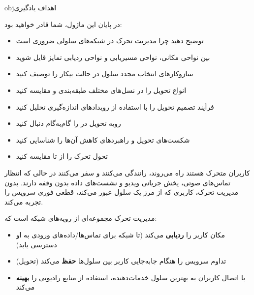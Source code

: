 \begin{CNbox}[unbreakable]{obj}{اهداف یادگیری}

در پایان این ماژول، شما قادر خواهید بود:

\begin{itemize}
\tightlist
\item
  توضیح دهید چرا مدیریت تحرک در شبکه‌های سلولی ضروری است
\item
  بین نواحی مکانی، نواحی مسیریابی و نواحی ردیابی تمایز قایل شوید
\item
  سازوکارهای انتخاب مجدد سلول در حالت بیکار را توصیف کنید
\item
  انواع تحویل را در نسل‌های مختلف طبقه‌بندی و مقایسه کنید
\item
  فرآیند تصمیم تحویل را با استفاده از رویدادهای اندازه‌گیری تحلیل کنید
\item
  رویه تحویل  در  را گام‌به‌گام دنبال کنید
\item
  شکست‌های تحویل و راهبردهای کاهش آن‌ها را شناسایی کنید
\item
  تحول تحرک را از  تا  مقایسه کنید
\end{itemize}

\end{CNbox}



\CNchained{}

کاربران متحرک هستند  راه می‌روند، رانندگی می‌کنند و سفر می‌کنند در حالی که انتظار تماس‌های صوتی، پخش جریانی ویدیو و نشست‌های داده بدون وقفه دارند. بدون مدیریت تحرک، کاربری که از مرز یک سلول عبور می‌کند، قطعی فوری سرویس را تجربه می‌کند.


مدیریت تحرک مجموعه‌ای از رویه‌های شبکه است که:

\begin{itemize}
\tightlist
\item
  مکان کاربر را \textbf{ردیابی} می‌کند (تا شبکه برای تماس‌ها/\allowbreak{}داده‌های ورودی به او دسترسی یابد)
\item
  تداوم سرویس را هنگام جابه‌جایی کاربر بین سلول‌ها \textbf{حفظ} می‌کند (تحویل)
\item
  با اتصال کاربران به بهترین سلول خدمات‌دهنده، استفاده از منابع رادیویی را \textbf{بهینه} می‌کند
\end{itemize}


